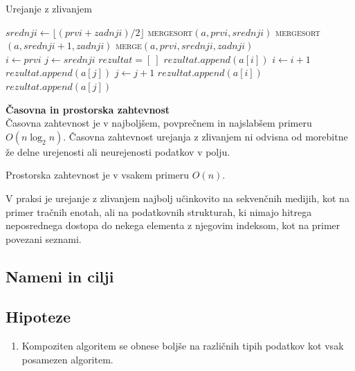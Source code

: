 \documentclass[a4paper,oneside,12pt]{article}
\newcommand{\subsubsubsection}[1]{\vspace*{1ex}\textbf{#1}\\}
\begin{document}
\begin{algorithm}
  \caption{Urejanje z zlivanjem}\label{algo:mergesort}
  \begin{algorithmic}[1]
         \Return \EndIf
        \State $srednji \gets \lfloor(prvi + zadnji) / 2\rfloor$
        \State \textsc{mergesort}$(a, prvi, srednji)$
        \State \textsc{mergesort}$(a, srednji + 1, zadnji)$
        \State \textsc{merge}$(a, prvi, srednji, zadnji)$
    \EndFunction
    \\
        \State $i \gets prvi$
        \State $j \gets srednji$
        \State $rezultat = [\ ]$ 
                \State $rezultat.append(a[i])$ 
                \State $i \gets i + 1$
            \Else
                \State $rezultat.append(a[j])$ 
                \State $j \gets j + 1$
            \EndIf
        \EndWhile
            \State $rezultat.append(a[i])$ 
        \EndWhile
            \State $rezultat.append(a[j])$ 
        \EndWhile
    \EndFunction
  \end{algorithmic}
\end{algorithm}

\subsubsubsection{Časovna in prostorska zahtevnost}
Časovna zahtevnost je v najboljšem, povprečnem in najslabšem primeru 
$O(n\log_2 n)$. Časovna zahtevnost urejanja z zlivanjem ni odvisna od
morebitne že delne urejenosti ali neurejenosti podatkov v polju. 

Prostorska zahtevnost je v vsakem primeru $O(n)$. %

V praksi je urejanje z zlivanjem najbolj učinkovito na
sekvenčnih medijih, kot na primer tračnih enotah, ali na podatkovnih strukturah, ki nimajo hitrega
neposrednega dostopa do nekega elementa z njegovim indeksom, kot na primer povezani seznami.

\subsection{Nameni in cilji}
\subsection{Hipoteze}
\begin{enumerate}
  \item Kompoziten algoritem se obnese boljše na različnih tipih podatkov kot vsak
    posamezen algoritem.
\end{enumerate}
\end{document}
